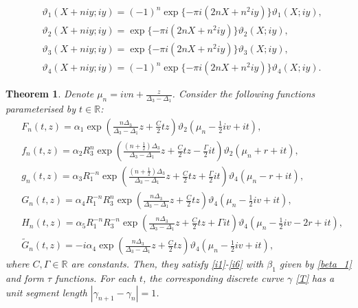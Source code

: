 \documentclass[10pt,a4paper]{amsart}
\newtheorem{theorem}{Theorem}
\newcommand{\R}{\mathbb{R}}
\begin{document}
\begin{equation}\label{cl}
\begin{split}
&\vartheta_1\left(X+niy; iy\right)=(-1)^{n}\exp\{-\pi i\left(2nX+n^{2}iy\right)\}\vartheta_1\left(X;iy\right),\\
&\vartheta_2\left(X+niy;iy\right)=\exp\{-\pi i\left(2nX+n^{2}iy\right)\}\vartheta_2\left(X;iy\right),\\
&\vartheta_3\left(X+niy;iy\right)=\exp\{-\pi i\left(2nX+n^{2}iy\right)\}\vartheta_3\left(X;iy\right),\\
&\vartheta_4\left(X+niy;iy\right)=(-1)^{n}\exp\{-\pi i\left(2nX+n^{2}iy\right)\}\vartheta_4\left(X;iy\right).
\end{split}
\end{equation}

\begin{theorem}\label{thm:PhDKal2}
Denote $\mu_{n}=ivn+\frac{z}{\Delta_{3}-\Delta_{1}}$. Consider the following functions parameterised by $t\in \R$:
\begin{align}\label{t}
&F_{n}(t, z)=\alpha_1\exp\left(\frac{n\Delta_{3}}{\Delta_{3}-\Delta_{1}}z+\frac{C}{2}tz\right)\vartheta_2\left(\mu_{n}-\frac{1}{2}iv+it\right),\\
&f_{n}(t, z)=\alpha_2 R_{3}^{n}\exp\left(\frac{\left(n+\frac{1}{2}\right)\Delta_{3}}{\Delta_{3}-\Delta_{1}}z+\frac{C}{2}tz-\frac{\Gamma}{2} it\right)\vartheta_2\left(\mu_{n}+r+it\right), \nonumber\\
&g_{n}(t, z)=\alpha_3 R_{1}^{-n}\exp\left(\frac{\left(n+\frac{1}{2}\right)\Delta_{3}}{\Delta_{3}-\Delta_{1}}z+\frac{C}{2}tz+\frac{\Gamma}{2} it\right)\vartheta_4\left(\mu_{n}-r+it\right), \nonumber\\
&G_{n}(t, z)=\alpha_4 R_{1}^{-n}R_{3}^{n}\exp\left(\frac{n\Delta_{3}}{\Delta_{3}-\Delta_{1}}z+\frac{C}{2}tz\right)\vartheta_4\left(\mu_{n}-\frac{1}{2}iv+it\right), \nonumber\\
&H_{n}(t, z)=\alpha_5 R_{1}^{-n}R_{3}^{-n}\exp\left(\frac{n\Delta_{3}}{\Delta_{3}-\Delta_{1}}z+\frac{C}{2}tz+\Gamma it\right)\vartheta_4\left(\mu_{n}-\frac{1}{2}iv-2r+it\right), \nonumber\\
&\widetilde{G}_{n}(t, z)=-i\alpha_4 \exp\left(\frac{n\Delta_{3}}{\Delta_{3}-\Delta_{1}}z+\frac{C}{2}tz\right)\vartheta_4\left(\mu_{n}-\frac{1}{2}iv+it\right),\nonumber
\end{align}
where $C, \Gamma\in\mathbb{R}$ are constants.
Then, they satisfy \eqref{i1}-\eqref{i6} with $\beta_{1}$ given by \eqref{beta_1} and form $\tau$ functions.
For each $t$,
the corresponding discrete curve $\gamma$ \eqref{T} has a unit segment length $\left|\gamma_{n+1}-\gamma_{n}\right|=1$.

\end{theorem}
\end{document}
